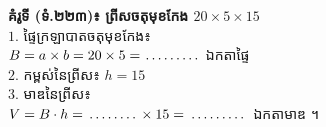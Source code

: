 \documentclass[a4paper,10pt]{article}
\newcommand{\en}[1]{{\TimesEn #1}}
\newcommand{\blank}[1]{\makebox[#1]{\dotfill}}
\begin{document}
\noindent
\begin{minipage}[t]{8.6cm}\vspace{0pt}
  \begin{tcolorbox}[
    enhanced, sharp corners, colback=white, colframe=black, equal height group=rowEx12,
    boxrule=0.8pt, boxsep=3pt, top=7.5pt, bottom=7.5pt, left=5pt, right=5pt
  ]\raggedright
    \textbf{គំរូទី \en{1} (ទំ.២២៣)៖ ព្រីសចតុមុខកែង $20\times 5\times 15$}\\[6.5pt]
    $1.$ ផ្ទៃក្រឡាបាតចតុមុខកែង៖\\
    \hspace*{0.2cm}$B = a \times b = 20 \times 5 = \blank{1.4cm}$ ឯកតាផ្ទៃ\\[6.5pt]
    $2.$ កម្ពស់នៃព្រីស៖ $h = 15$\\[6.5pt]
    $3.$ មាឌនៃព្រីស៖\\
    \hspace*{0.2cm}$V = B \cdot h = \blank{1.3cm} \times 15 = \blank{1.5cm}$ ឯកតាមាឌ ។
  \end{tcolorbox}
\end{minipage}%
\hfill
\end{document}
